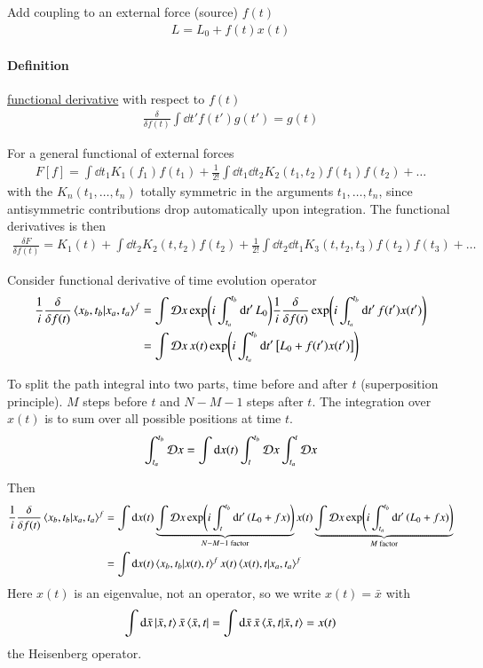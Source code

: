 Add coupling to an external force (source) $f(t)$
\begin{align}
   L = L_0 + f(t) x(t)
\end{align}

\paragraph{Definition} \underline{functional derivative} with respect to $f(t)$
\begin{align}
   \frac{\delta}{\delta f(t)} \int \dd{t'} f(t') g(t') = g(t)
\end{align}

For a general functional of external forces
\begin{align}
   F[f] = \int \dd{t_1} K_1(f_1) f(t_1) + \frac{1}{2!} \int \dd{t_1} \dd{t_2} K_2(t_1, t_2) f(t_1) f(t_2)  + \dots
\end{align}
with the $K_n(t_1, \dots, t_n)$ totally symmetric in the arguments $t_1, \dots , t_n$, since antisymmetric contributions drop automatically upon integration. The functional derivatives is then
\begin{align}
   \frac{\delta F}{\delta f(t)} = K_1(t) + \int \dd{t_2} K_2 (t, t_2) f(t_2) + \frac{1}{2!} \int \dd{t_2} \dd{t_1} K_3(t, t_2, t_3) f(t_2) f(t_3) + \dots
\end{align}

Consider functional derivative of time evolution operator
\begin{align*}
   \frac{1}{i} \frac{\delta}{\delta f(t)} \braket{x_b, t_b | x_a, t_a}^f  
   &= \int \mathcal{D} x \exp(i \int^{t_b}_{t_a} \dd{t'}L_0) \frac{1}{i} \frac{\delta}{\delta f(t)} \exp(i\int^{t_b}_{t_a}\dd{t'}f(t')x(t')) \\
   &= \int \mathcal{D} x \, x(t) \exp(i\int^{t_b}_{t_a} \dd{t'} \left[ L_0 + f(t') x(t') \right] )
\end{align*}

To split the path integral into two parts, time before and after $t$ (superposition principle). $M$ steps before $t$ and $N-M-1$ steps after $t$. The integration over $x(t)$ is to sum over all possible positions at time $t$.
\begin{align*}
   \int^{t_b}_{t_a} \mathcal{D} x  = \int \dd{x(t)} \int^{t_b}_t \mathcal{D} x \int^t_{t_a} \mathcal{D} x
\end{align*}

Then
\begin{align*}
   \frac{1}{i} \frac{\delta}{\delta f(t)} \braket{x_b, t_b | x_a, t_a}^f  &= \int \dd{x(t)} \underbrace{\int \mathcal{D} x \exp(i \int^{t_b}_{t} \dd{t'} (L_0 + f x))}_{N-M-1 \text{ factor}} x(t) \underbrace{\int \mathcal{D} x \exp(i\int^{t_b}_{t_a} \dd{t'} (L_0 + fx))}_{M \text{ factor}} \\
                                                                        &= \int \dd{x(t)} \braket{x_b, t_b | x(t), t}^f x(t) \braket{x(t), t | x_a, t_a}^f
\end{align*}
Here $x(t)$ is an eigenvalue, not an operator, so we write $x(t) = \bar{x}$ with 
\begin{align*}
\int \dd{\bar{x}} \ket{\bar{x}, t} \bar{x} \bra{\bar{x}, t} = \int \dd{\bar{x}} \bar{x} \braket{\bar{x}, t | \bar{x}, t}  = x(t)
\end{align*}
the Heisenberg operator.

